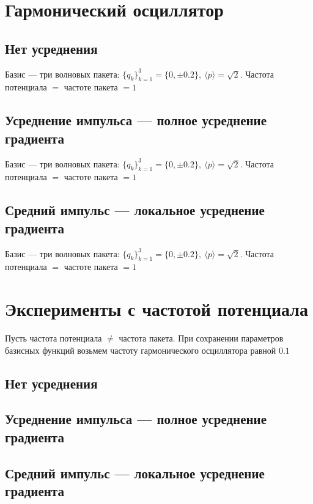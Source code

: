 \documentclass[a4paper,14pt]{extarticle}
\begin{document}
\section{Гармонический осциллятор}

\subsection{Нет усреднения}


Базис --- три волновых пакета: $\{q_k\}_{k=1}^3 = \{0, \pm 0.2\},\ \langle p\rangle = \sqrt{2}$.
Частота потенциала $=$ частоте пакета $= 1$



\newpage

\subsection{Усреднение импульса --- полное усреднение градиента}


Базис --- три волновых пакета: $\{q_k\}_{k=1}^3 = \{0, \pm 0.2\},\ \langle p\rangle = \sqrt{2}$.
Частота потенциала $=$ частоте пакета $= 1$


\newpage

\subsection{Средний импульс --- локальное усреднение градиента}


Базис --- три волновых пакета: $\{q_k\}_{k=1}^3 = \{0, \pm 0.2\},\ \langle p\rangle = \sqrt{2}$.
Частота потенциала $=$ частоте пакета $= 1$


\newpage

\section{Эксперименты с частотой потенциала}
Пусть частота потенциала $\neq$ частота пакета. 
При сохранении параметров базисных функций возьмем частоту гармонического осциллятора равной $0.1$

\subsection{Нет усреднения}

\newpage

\subsection{Усреднение импульса --- полное усреднение градиента}

\newpage

\subsection{Средний импульс --- локальное усреднение градиента}

\end{document}
